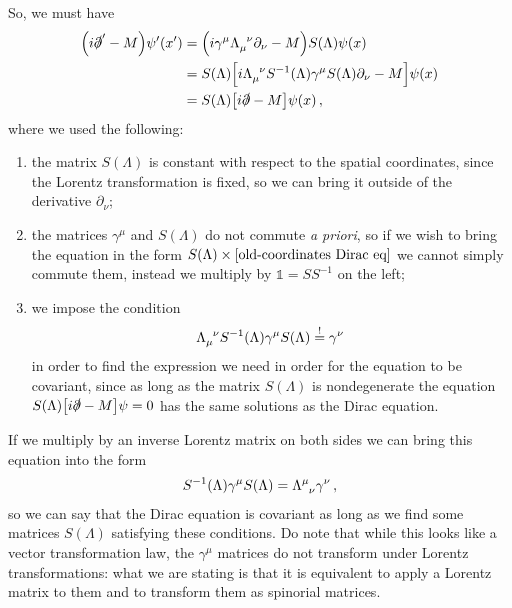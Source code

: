 \documentclass[main.tex]{subfiles}
\begin{document}
So, we must have 
%
\begin{align}
\qty(i \slashed{\partial}' - M) \psi^{\prime } (x') &=
\qty(i \gamma^{\mu } \tensor{\Lambda }{_{\mu }^{\nu }} \partial_{\nu } -M) S(\Lambda ) \psi (x)  
\\
&= S(\Lambda ) \qty[i \tensor{\Lambda }{_{\mu }^{\nu }} S^{-1}(\Lambda ) 
\gamma^{\mu } S(\Lambda ) \partial_{\nu } - M ] \psi (x)  \\
&=S(\Lambda ) \qty[i \slashed{\partial} - M] \psi (x)
\,,
\end{align}
%
where we used the following:
\begin{enumerate}
  \item the matrix \(S(\Lambda )\) is constant with respect to the spatial coordinates, since the Lorentz transformation is fixed, so we can bring it outside of the derivative \(\partial_{\nu }\);
  \item the matrices \(\gamma^{\mu }  \) and \(S(\Lambda )\) do not commute \emph{a priori}, so if we wish to bring the equation in the form \(S(\Lambda ) \times \qty[\text{old-coordinates Dirac eq}]\) we cannot simply commute them, instead we multiply by \(\mathbb{1} = S S^{-1}\) on the left;
  \item we impose the condition 
  \begin{align}
  \tensor{\Lambda }{_{\mu }^{\nu }} S^{-1}(\Lambda ) \gamma^{\mu } S(\Lambda ) \overset{!}{=} \gamma^{\nu }
  \,
  \end{align}
  in order to find the expression we need in order for the equation to be covariant, since as long as the matrix \(S(\Lambda )\) is nondegenerate the equation \(S(\Lambda ) \qty[i \slashed{\partial} - M] \psi =0\) has the same solutions as the Dirac equation.
\end{enumerate}

If we multiply by an inverse Lorentz matrix on both sides we can bring this equation into the form 
% 
\begin{align} \label{eq:spinorial-representation-definition}
S^{-1}(\Lambda ) \gamma^{\mu } S(\Lambda ) = \tensor{\Lambda }{^{\mu }_{\nu }} \gamma^{\nu }
\,,
\end{align}
%
so we can say that the Dirac equation is covariant as long as we find some matrices \(S(\Lambda )\) satisfying these conditions. 
Do note that while this looks like a vector transformation law, the \(\gamma^{\mu }\) matrices do not transform under Lorentz transformations: what we are stating is that it is equivalent to apply a Lorentz matrix to them and to transform them as spinorial matrices. 
\end{document}
